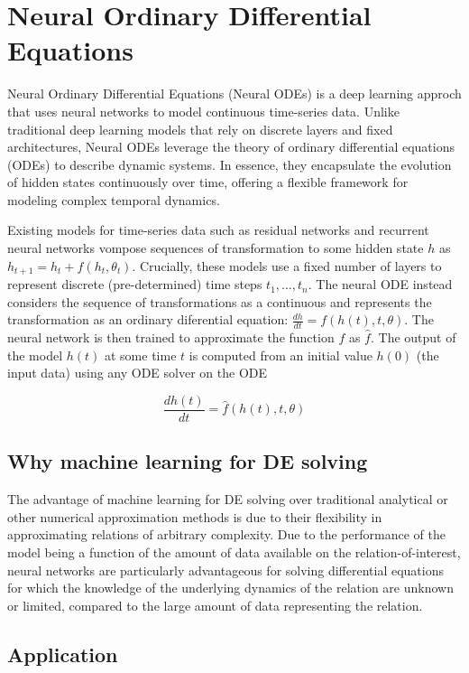\documentclass[11pt]{article}
\begin{document}
\section{Neural Ordinary Differential Equations}

Neural Ordinary Differential Equations (Neural ODEs) is a deep learning approch that uses neural networks to model continuous time-series data. Unlike traditional deep learning models that rely on discrete layers and fixed architectures, Neural ODEs leverage the theory of ordinary differential equations (ODEs) to describe dynamic systems. In essence, they encapsulate the evolution of hidden states continuously over time, offering a flexible framework for modeling complex temporal dynamics.

Existing models for time-series data such as residual networks and recurrent neural networks vompose sequences of transformation to some hidden state $h$ as $h_{t + 1} = h_t + f(h_t, \theta_t)$. Crucially, these models use a fixed number of layers to represent discrete (pre-determined) time steps $t_1, \dots, t_n$. The neural ODE instead considers the sequence of transformations as a continuous and represents the transformation as an ordinary diferential equation: $\frac{dh}{dt} = f(h(t), t, \theta)$. The neural network is then trained to approximate the function $f$ as $\hat f$. The output of the model $h(t)$ at some time $t$ is computed from an initial value $h(0)$ (the input data) using any ODE solver on the ODE

$$
\frac{dh(t)}{dt} = \hat f(h(t), t, \theta)
$$

\subsection{Why machine learning for DE solving}

The advantage of machine learning for DE solving over traditional analytical or other numerical approximation methods is due to their flexibility in approximating relations of arbitrary complexity. Due to the performance of the model being a function of the amount of data available on the relation-of-interest, neural networks are particularly advantageous for solving differential equations for which the knowledge of the underlying dynamics of the relation are unknown or limited, compared to the large amount of data representing the relation.

\subsection{Application}
\end{document}
